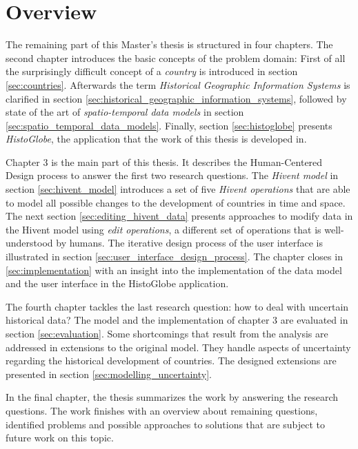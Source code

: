\section{Overview} %
\label{sec:overview}

The remaining part of this Master's thesis is structured in four chapters. The second chapter introduces the basic concepts of the problem domain: First of all the surprisingly difficult concept of a \emph{country} is introduced in section \ref{sec:countries}. Afterwards the term \emph{Historical Geographic Information Systems} is clarified in section \ref{sec:historical_geographic_information_systems}, followed by state of the art of \emph{spatio-temporal data models}  in section \ref{sec:spatio_temporal_data_models}. Finally, section \ref{sec:histoglobe} presents \emph{HistoGlobe}, the application that the work of this thesis is developed in.

Chapter 3 is the main part of this thesis. It describes the Human-Centered Design process to answer the first two research questions. The \emph{Hivent model} in section \ref{sec:hivent_model} introduces a set of five \emph{Hivent operations} that are able to model all possible changes to the development of countries in time and space. The next section \ref{sec:editing_hivent_data} presents approaches to modify data in the Hivent model using \emph{edit operations}, a different set of operations that is well-understood by humans. The iterative design process of the user interface is illustrated in section \ref{sec:user_interface_design_process}. The chapter closes in \ref{sec:implementation} with an insight into the implementation of the data model and the user interface in the HistoGlobe application.

The fourth chapter tackles the last research question: how to deal with uncertain historical data? The model and the implementation of chapter 3 are evaluated in section \ref{sec:evaluation}. Some shortcomings that result from the analysis are addressed in extensions to the original model. They handle aspects of uncertainty regarding the historical development of countries. The designed extensions are presented in section \ref{sec:modelling_uncertainty}.

In the final chapter, the thesis summarizes the work by answering the research questions. The work finishes with an overview about remaining questions, identified problems and possible approaches to solutions that are subject to future work on this topic.



